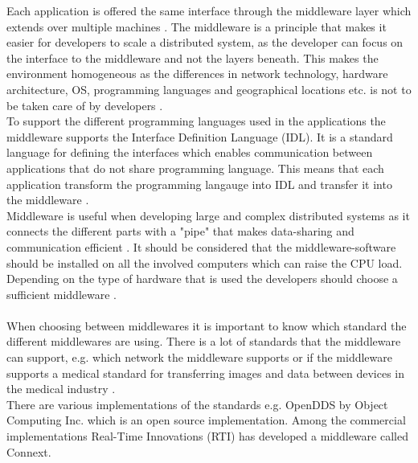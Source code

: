 \documentclass[Main]{subfiles}
\begin{document}
Each application is offered the same interface through the middleware layer which extends over multiple machines \cite[p. 3]{Tanenbaum}. The middleware is a principle that makes it easier for developers to scale a distributed system, as the developer can focus on the interface to the middleware and not the layers beneath. This makes the environment homogeneous as the differences in network technology, hardware architecture, OS, programming languages and geographical locations etc. is not to be taken care of by developers \cite{DDS-slides} \cite[p. 68]{Coulouris}.
\\
To support the different programming languages used in the applications the middleware supports the Interface Definition Language (IDL). It is a standard language for defining the interfaces which enables communication between applications that do not share programming language. This means that each application transform the programming langauge into IDL and transfer it into the middleware \cite{DDS-slides} \cite{RTI} \cite{wiki-idl}.
\\
Middleware is useful when developing large and complex distributed systems as it connects the different parts with a "pipe" that makes data-sharing and communication efficient \cite{DDS-slides} \cite[p. 68]{Coulouris}. It should be considered that the middleware-software should be installed on all the involved computers which can raise the CPU load. Depending on the type of hardware that is used the developers should choose a sufficient middleware \cite{DDS-slides}.
\\
\\
When choosing between middlewares it is important to know which standard the different middlewares are using. There is a lot of standards that the middleware can support, e.g. which network the middleware supports or if the middleware supports a medical standard for transferring images and data between devices in the medical industry \cite{DDS_slides}.\\
There are various implementations of the standards e.g. OpenDDS by Object Computing Inc. which is an open source implementation. Among the commercial implementations Real-Time Innovations (RTI) has developed a middleware called Connext.
\end{document}
